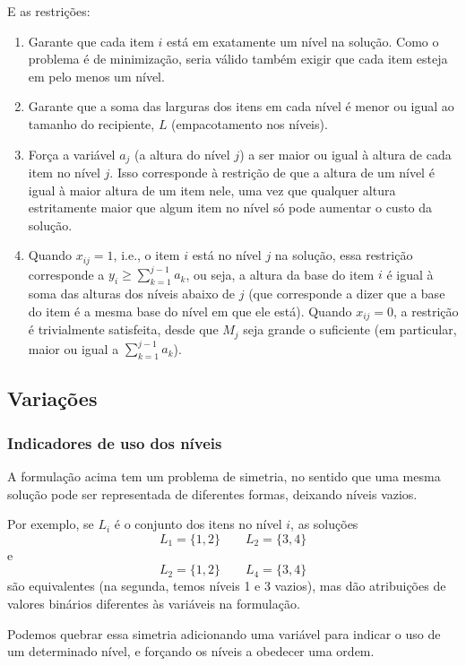\documentclass{article}
\begin{document}
E as restrições:
\begin{enumerate}[(1)]
    \item Garante que cada item $i$ está em exatamente um nível na solução. Como o problema é de minimização, seria válido também exigir que cada item esteja em pelo menos um nível.
    \item Garante que a soma das larguras dos itens em cada nível é menor ou igual ao tamanho do recipiente, $L$ (empacotamento nos níveis).
    \item Força a variável $a_j$ (a altura do nível $j$) a ser maior ou igual à altura de cada item no nível $j$. Isso corresponde à restrição de que a altura de um nível é igual à maior altura de um item nele, uma vez que qualquer altura estritamente maior que algum item no nível só pode aumentar o custo da solução.
    \item Quando $x_{ij} = 1$, i.e., o item $i$ está no nível $j$ na solução, essa restrição corresponde a $y_i \geq \sum_{k = 1}^{j - 1} a_k$, ou seja, a altura da base do item $i$ é igual à soma das alturas dos níveis abaixo de $j$ (que corresponde a dizer que a base do item é a mesma base do nível em que ele está). Quando $x_{ij} = 0$, a restrição é trivialmente satisfeita, desde que $M_j$ seja grande o suficiente (em particular, maior ou igual a $\sum_{k = 1}^{j - 1} a_k$).
\end{enumerate}

\subsection{Variações}

\subsubsection{Indicadores de uso dos níveis}

A formulação acima tem um problema de simetria, no sentido que uma mesma solução pode ser representada de diferentes formas, deixando níveis vazios.

Por exemplo, se $L_i$ é o conjunto dos itens no nível $i$, as soluções
$$L_1 = \{1, 2\} \qquad L_2 = \{3, 4\}$$
e
$$L_2 = \{1, 2\} \qquad L_4 = \{3, 4\}$$
são equivalentes (na segunda, temos níveis 1 e 3 vazios), mas dão atribuições de valores binários diferentes às variáveis na formulação.

Podemos quebrar essa simetria adicionando uma variável para indicar o uso de um determinado nível, e forçando os níveis a obedecer uma ordem.
\end{document}
